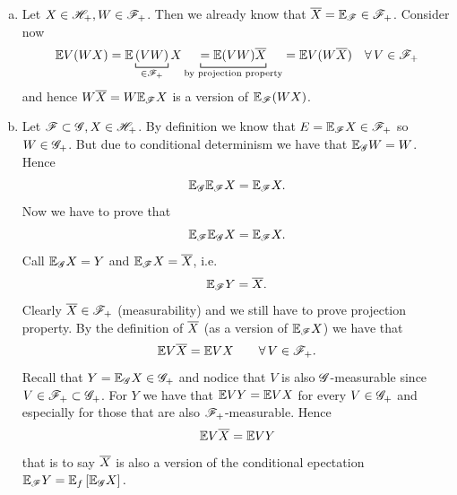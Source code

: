 \documentclass{report}
\begin{document}
\begin{fancyproof}
	\begin{enumerate}[a)]
		\item Let $X\in\mathscr{H}_+,W\in\mathscr{F}_+$. Then we already know that $\overline{X}=\mathbb{E}_{\mathscr{F}}\in\mathscr{F}_+$. Consider now
		\begin{equation*}
			\ev V(WX)=\ev\underbracket[0.6pt]{(VW)}_{\in\F_+}X\underbracket[0.6pt]{=\ev(VW)\xbar}_{\text{by projection property}}=\ev V(W\xbar)\quad\every V\in\F_+
		\end{equation*}
		and hence $W\overline{X}=W\mathbb{E}_{\mathscr{F}} X$ is a version of $\mathbb{E}_{\mathscr{F}}(WX)$.
		\item Let $\mathscr{F}\subset\mathscr{G},X\in\mathscr{H}_+$. By definition we know that $E=\mathbb{E}_{\mathscr{F}} X\in\mathscr{F}_+$ so $W\in\mathscr{G}_+$. But due to conditional determinism we have that $\mathbb{E}_{\mathscr{G}} W=W$. Hence
		\[\mathbb{E}_{\mathscr{G}}\mathbb{E}_{\mathscr{F}} X=\mathbb{E}_{\mathscr{F}} X.\]
		Now we have to prove that 
		\[\mathbb{E}_{\mathscr{F}}\mathbb{E}_{\mathscr{G}} X=\mathbb{E}_{\mathscr{F}} X.\]
		Call $\mathbb{E}_{\mathscr{G}} X=Y$ and $\mathbb{E}_{\mathscr{F}} X=\overline{X}$, i.e.
		\[\mathbb{E}_{\mathscr{F}} Y=\overline{X}.\]
		Clearly $\overline{X}\in\mathscr{F}_+$ (\checkmark measurability) and we still have to prove projection property. By the definition of $\overline{X}$ (as a version of $\mathbb{E}_{\mathscr{F}} X$) we have that 
		\[\mathbb{E} V\overline{X}=\mathbb{E} VX\qquad\forall\, V\in\mathscr{F}_+.\]
		Recall that $Y=\mathbb{E}_{\mathscr{G}} X\in\mathscr{G}_+$ and nodice that $V$ is also $\mathscr{G}$-measurable since $V\in\mathscr{F}_+\subset\mathscr{G}_+$.
		For $Y$ we have that $\mathbb{E} VY=\mathbb{E} VX$ for every $V\in\mathscr{G}_+$ and especially for those that are also $\mathscr{F}_+$-measurable. Hence
		\[\mathbb{E} V\overline{X}=\mathbb{E} VY\]
		that is to say $\overline{X}$ is also a version of the conditional epectation $\mathbb{E}_{\mathscr{F}} Y=\mathbb{E}_f\left[\mathbb{E}_{\mathscr{G}} X\right].$
	\end{enumerate}
\end{fancyproof}
\end{document}
